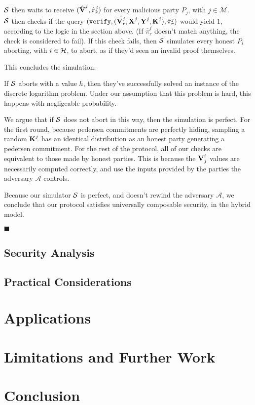 $\mathcal{S}$ then waits to receive $(\hat{\textbf{V}}^j, \hat{\pi}^j_r)$ for
every malicious party $P_j$, with ${j \in \mathcal{M}}$.\\
$\mathcal{S}$ then checks if the query $(\texttt{verify}, (\hat{\textbf{V}^j_r}, \textbf{X}^j, \textbf{Y}^j, \textbf{K}^j), \hat{\pi}^j_r)$
would yield $1$, according to the logic in the section above.
(If $\hat{\pi}^j_r$ doesn't match anything, the check is considered to fail).
If this check fails, then $\mathcal{S}$ simulates every honest $P_i$ aborting, with $i \in \mathcal{H}$,
to abort, as if they'd seen an invalid proof themselves.

This concludes the simulation.

If $\mathcal{S}$ aborts with a value $h$, then they've successfully
solved an instance of the discrete logarithm problem. Under our
assumption that this problem is hard, this happens with negligeable
probability.

We argue that if $\mathcal{S}$ does not abort in this way, then the simulation
is perfect. For the first round, because pedersen commitments
are perfectly hiding, sampling a random $\textbf{K}^j$ has an identical
distribution as an honest party generating a pedersen commitment.
For the rest of the protocol, all of our checks are equivalent
to those made by honest parties. This is because the
$\textbf{V}^i_j$ values are necessarily computed correctly, and use
the inputs provided by the parties the adversary $\mathcal{A}$ controls.

Because our simulator $\mathcal{S}$ is perfect, and doesn't
rewind the adversary $\mathcal{A}$, we conclude that our protocol
satisfies universally composable security, in the hybrid model.

$\blacksquare$

\subsection{Security Analysis}

\subsection{Practical Considerations}

\section{Applications}

\section{Limitations and Further Work}

\section{Conclusion}


\small 


